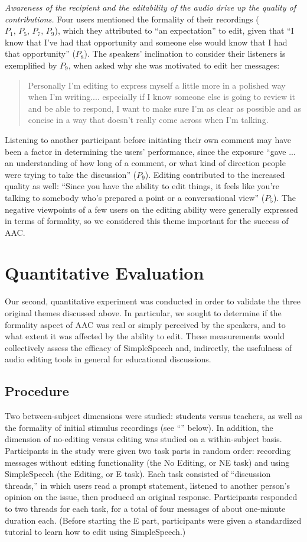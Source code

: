 \emph{Awareness of the recipient and the editability of the audio drive up the quality of contributions.}
Four users mentioned the formality of their recordings ($P_1,\,P_5,\,P_7,\,P_9$), which they attributed to ``an expectation'' to edit, given that ``I know that I've had that opportunity and someone else would know that I had that opportunity'' ($P_8$).
The speakers' inclination to consider their listeners is exemplified by $P_9$, when asked why she was motivated to edit her messages:
\begin{quote}
	Personally I'm editing to express myself a little more in a polished way when I'm writing.... especially if I know someone else is going to review it and be able to respond, I want to make sure I'm as clear as possible and as concise in a way that doesn't really come across when I'm talking.
\end{quote}
Listening to another participant before initiating their own comment may have been a factor in determining the users' performance, since the exposure ``gave ... an understanding of how long of a comment, or what kind of direction people were trying to take the discussion'' ($P_9$). 
Editing contributed to the increased quality as well: ``Since you have the ability to edit things, it feels like you're talking to somebody who's prepared a point or a conversational view'' ($P_5$). 
The negative viewpoints of a few users on the editing ability were generally expressed in terms of formality, so we considered this theme important for the success of AAC.

\section{Quantitative Evaluation}
Our second, quantitative experiment was conducted in order to validate the three original themes discussed above.
In particular, we sought to determine if the formality aspect of AAC was real or simply perceived by the speakers, and to what extent it was affected by the ability to edit.
These measurements would collectively assess the efficacy of SimpleSpeech and, indirectly, the usefulness of audio editing tools in general for educational discussions.

\subsection{Procedure}
Two between-subject dimensions were studied: students versus teachers, as well as the formality of initial stimulus recordings (see ``'' below).
In addition, the dimension of no-editing versus editing was studied on a within-subject basis.
Participants in the study were given two task parts in random order: recording messages without editing functionality (the No Editing, or NE task) and using SimpleSpeech (the Editing, or E task). 
Each task consisted of ``discussion threads,'' in which users read a prompt statement, listened to another person's opinion on the issue, then produced an original response.
Participants responded to two threads for each task, for a total of four messages of about one-minute duration each.
(Before starting the E part, participants were given a standardized tutorial to learn how to edit using SimpleSpeech.)

